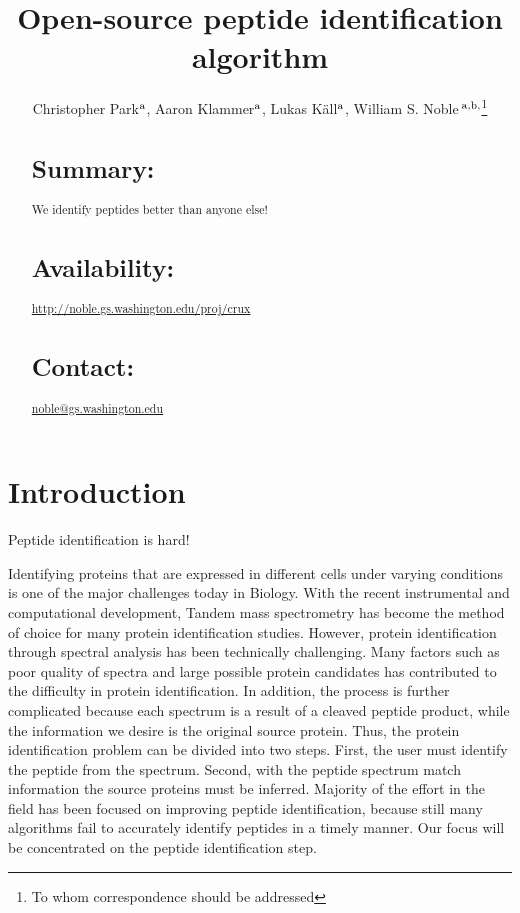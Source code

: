 \documentclass{bioinfo}
\begin{document}

\title[Open-source peptide identification algorithm]{Open-source
peptide identification algorithm}
\author[Park \textit{et~al}]{Christopher Park$^{\rm a}$, Aaron Klammer$^{\rm a}$,
Lukas K\"{a}ll$^{\rm a}$, 
William S. Noble\,$^{\rm a,b,}$\footnote{To whom correspondence should be addressed}}
\address{
$^{\rm a}$Department of Computer Science and Engineering,
$^{\rm b}$Department of Genome Sciences, University of Washington,
  Seattle, WA, USA
}
\maketitle

\begin{abstract}
\section{Summary:}

We identify peptides better than anyone else! 

\section{Availability:}
\href{http://noble.gs.washington.edu/proj/crux}{http://noble.gs.washington.edu/proj/crux}
\section{Contact:} \href{noble@gs.washington.edu}{noble@gs.washington.edu}
\end{abstract}

\section{Introduction}

Peptide identification is hard!

Identifying proteins that are expressed in different cells under
varying conditions is one of the major challenges today in
Biology. With the recent instrumental and computational development,
Tandem mass spectrometry has become the method of choice for many
protein identification studies. However, protein identification
through spectral analysis has been technically challenging. Many
factors such as poor quality of spectra and large possible protein
candidates has contributed to the difficulty in protein
identification. In addition, the process is further complicated
because each spectrum is a result of a cleaved peptide product, while
the information we desire is the original source protein. Thus, the
protein identification problem can be divided into two steps. First,
the user must identify the peptide from the spectrum. Second, with the
peptide spectrum match information the source proteins must be
inferred. Majority of the effort in the field has been focused on
improving peptide identification, because still many algorithms fail
to accurately identify peptides in a timely manner. Our focus will be
concentrated on the peptide identification step.
\end{document}
